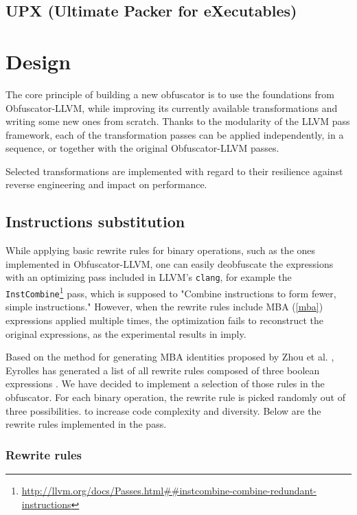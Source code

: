 \documentclass[
  digital, %
  notable,   %
  twoside, %
  nolof,     %
  nolot,     %
]{fithesis3}
\theoremstyle{definition}
\begin{document}
\section{UPX (Ultimate Packer for eXecutables)}

\chapter{Design}

The core principle of building a new obfuscator is to use the foundations from Obfuscator-LLVM, while improving its currently available transformations and writing some new ones from scratch. Thanks to the modularity of the LLVM pass framework, each of the transformation passes can be applied independently, in a sequence, or together with the original Obfuscator-LLVM passes. 

Selected transformations are implemented with regard to their resilience against reverse engineering and impact on performance.

\section{Instructions substitution}
While applying basic rewrite rules for binary operations, such as the ones implemented in Obfuscator-LLVM, one can easily deobfuscate the expressions with an optimizing pass included in LLVM's \texttt{clang}, for example the \texttt{InstCombine}\footnote{\url{http://llvm.org/docs/Passes.html##instcombine-combine-redundant-instructions}} pass, which is supposed to "Combine instructions to form fewer, simple instructions." However, when the rewrite rules include MBA (\ref{mba}) expressions applied multiple times, the optimization fails to reconstruct the original expressions, as the experimental results in \cite{eyrollesMBAobf} imply. 

Based on the method for generating MBA identities proposed by Zhou et al. \cite{mba_zhou}, Eyrolles has generated a list of all rewrite rules composed of three boolean expressions \cite{eyrollesMBAobf}. We have decided to implement a selection of those rules in the obfuscator. For each binary operation, the rewrite rule is picked randomly out of three possibilities. to increase code complexity and diversity. Below are the rewrite rules implemented in the pass.

\subsection{Rewrite rules}
\end{document}
